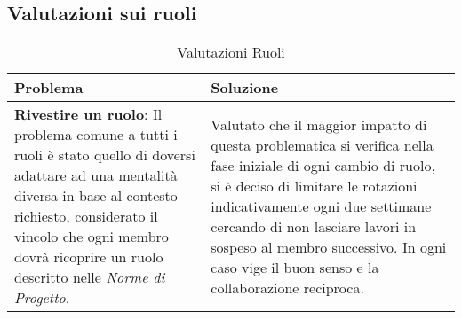 \subsection{Valutazioni sui ruoli}
	\begin{longtable}{ 
			>{\centering}p{} 
			>{\centering\arraybackslash}p{} }
		
		\caption {Valutazioni Ruoli}		\\
		
		\textbf{\color{white}Problema} &
		\textbf{\color{white}Soluzione}
		\tabularnewline  
		\endhead
		
		\textbf{Rivestire un ruolo}: Il problema comune a tutti i ruoli è stato quello di doversi adattare ad una mentalità diversa in base al contesto richiesto, considerato il vincolo che ogni membro dovrà ricoprire un ruolo descritto nelle \textit{Norme di Progetto}. & Valutato che il maggior impatto di questa problematica si verifica nella fase iniziale di ogni cambio di ruolo, si è deciso di limitare le rotazioni indicativamente ogni due settimane cercando di non lasciare lavori in sospeso al membro successivo. In ogni caso vige il buon senso e la collaborazione reciproca. \\
		
	\end{longtable}


